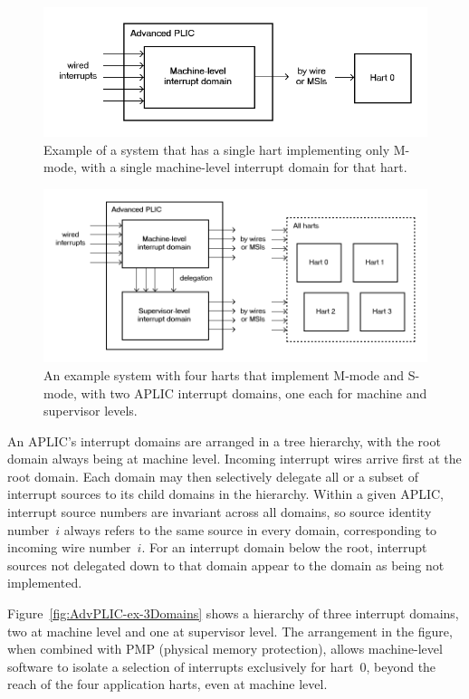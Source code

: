 \begin{figure}[th]
\centerline{\includegraphics[scale=0.55]{AdvPLIC-ex-1Domain.png}}
\caption{%
Example of a {\RISCV} system that has a single hart implementing only
\mbox{M-mode}, with a single machine-level interrupt domain for that
hart.%
}
\label{fig:AdvPLIC-ex-1Domain}
\end{figure}

\begin{figure}[th]
\centerline{\includegraphics[scale=0.55]{AdvPLIC-ex-2Domains.png}}
\caption{%
An example system with four harts that implement \mbox{M-mode} and
\mbox{S-mode}, with two APLIC interrupt domains, one each for machine
and supervisor levels.%
}
\label{fig:AdvPLIC-ex-2Domains}
\end{figure}

An APLIC's interrupt domains are arranged in a tree hierarchy, with the
root domain always being at machine level.
Incoming interrupt wires arrive first at the root domain.
Each domain may then selectively delegate all or a subset of interrupt
sources to its child domains in the hierarchy.
Within a given APLIC, interrupt source numbers are invariant across all
domains, so source identity number~$i$ always refers to the same source
in every domain, corresponding to incoming wire number~$i$.
For an interrupt domain below the root, interrupt sources not delegated
down to that domain appear to the domain as being not implemented.

Figure~\ref{fig:AdvPLIC-ex-3Domains} shows a hierarchy of three
interrupt domains, two at machine level and one at supervisor level.
The arrangement in the figure, when combined with PMP (physical memory
protection), allows machine-level software to isolate a selection
of interrupts exclusively for hart~0, beyond the reach of the four
application harts, even at machine level.

